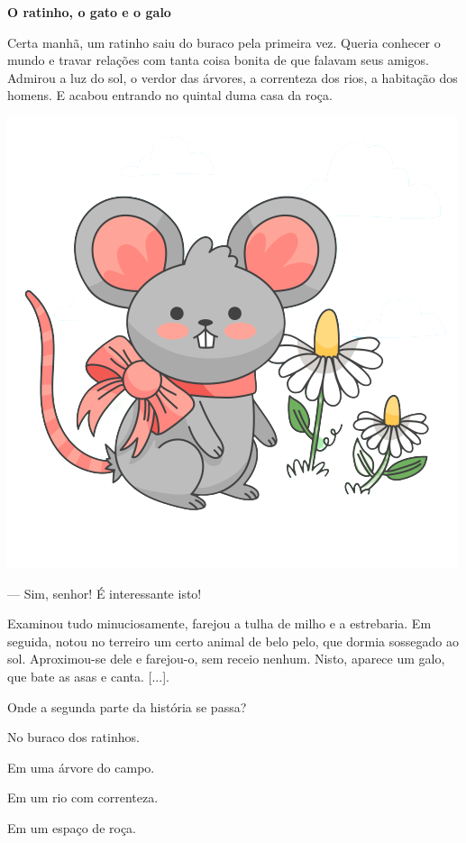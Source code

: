 \begin{myquote}
\textbf{O ratinho, o gato e o galo}

Certa manhã, um ratinho saiu do buraco pela primeira vez. Queria
conhecer o mundo e travar relações com tanta coisa bonita de que falavam
seus amigos. Admirou a luz do sol, o verdor das árvores, a correnteza
dos rios, a habitação dos homens. E acabou entrando no quintal duma casa
da roça.

\begin{center}
\includegraphics[width=.5\textwidth]{./media/image1d.png}
\end{center}

--- Sim, senhor! É interessante isto!

Examinou tudo minuciosamente, farejou a tulha de milho e a estrebaria.
Em seguida, notou no terreiro um certo animal de belo pelo, que dormia
sossegado ao sol. Aproximou-se dele e farejou-o, sem
receio nenhum. Nisto, aparece um galo, que bate as asas e canta.
{[}...{]}.

\end{myquote}

\pagebreak
Onde a segunda parte da história se passa?

\begin{escolha}[itemsep=-5pt]
\item No buraco dos ratinhos.

\item Em uma árvore do campo.

\item Em um rio com correnteza.

\item Em um espaço de roça.
\end{escolha}


